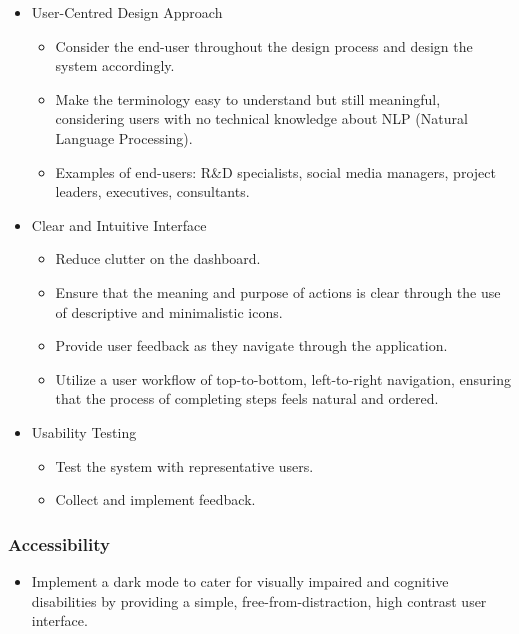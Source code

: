 \documentclass[12pt]{article}
\begin{document}
\begin{itemize}
  \item User-Centred Design Approach
        \begin{itemize}
          \item Consider the end-user throughout the design process and design the system accordingly.
          \item Make the terminology easy to understand but still meaningful, considering users with no technical knowledge about NLP (Natural Language Processing).
          \item Examples of end-users: R\&D specialists, social media managers, project leaders, executives, consultants.
        \end{itemize}
  \item Clear and Intuitive Interface
        \begin{itemize}
          \item Reduce clutter on the dashboard.
          \item Ensure that the meaning and purpose of actions is clear through the use of descriptive and minimalistic icons.
          \item Provide user feedback as they navigate through the application.
          \item Utilize a user workflow of top-to-bottom, left-to-right navigation, ensuring that the process of completing steps feels natural and ordered.
        \end{itemize}
  \item Usability Testing
        \begin{itemize}
          \item Test the system with representative users.
          \item Collect and implement feedback.
        \end{itemize}
\end{itemize}

\subsubsection*{Accessibility}
\begin{itemize}
\item Implement a dark mode to cater for visually impaired and cognitive disabilities by providing a simple, free-from-distraction, high contrast user interface.
\end{itemize}
\end{document}
